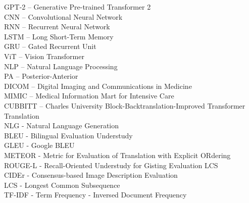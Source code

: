 \documentclass[12pt,a4paper]{report}
\begin{document}



\tableofcontents












\listoffigures

\listoftables

\noindent GPT-2 -- Generative Pre-trained Transformer 2\\
CNN -- Convolutional Neural Network\\
RNN -- Recurrent Neural Network\\
LSTM -- Long Short-Term Memory\\
GRU -- Gated Recurrent Unit\\
ViT -- Vision Transformer\\
NLP -- Natural Language Processing\\
PA -- Posterior-Anterior\\
DICOM -- Digital Imaging and Communications in Medicine\\
MIMIC -- Medical Information Mart for Intensive Care\\
CUBBITT -- Charles University Block-Backtranslation-Improved Transformer Translation\\
NLG - Natural Language Generation\\
BLEU - Bilingual Evaluation Understudy\\
GLEU - Google BLEU\\
METEOR - Metric for Evaluation of Translation with Explicit ORdering\\
ROUGE-L - Recall-Oriented Understudy for Gisting Evaluation LCS\\
CIDEr - Consensus-based Image Description Evaluation\\
LCS - Longest Common Subsequence\\
TF-IDF - Term Frequency - Inversed Document Frequency
\end{document}
